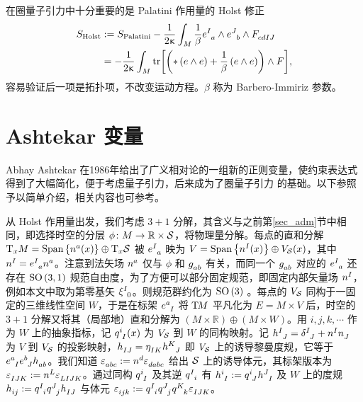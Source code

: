 		在圈量子引力中十分重要的是 Palatini 作用量的 Holst 修正
		\begin{equation}
			\begin{split}
				S_{\text{Holst}} &\definedby S_{\text{Palatini}} - \frac{1}{2\gkappa} \int_M \frac{1}{\beta} \tensor{e}{^I_a} \wedge \tensor{e}{^J_b} \wedge \tensor{F}{_c_d_I_J}\\
				&= - \frac{1}{2\gkappa} \int_M \tr[\left( *\left( e \wedge e \right) + \frac{1}{\beta} \left( e \wedge e \right) \right) \wedge F],\label{eq-Holst_action}
			\end{split}
		\end{equation}
		容易验证后一项是拓扑项，不改变运动方程。$\beta$ 称为 Barbero-Immiriz 参数。


	\section{Ashtekar 变量}

		Abhay Ashtekar 在1986年给出了广义相对论的一组新的正则变量\cite{Ashtekar1986,Ashtekar1987}，使约束表达式得到了大幅简化，便于考虑量子引力，后来成为了圈量子引力 的基础。以下参照  予以简单介绍，相关内容也可参考。

		从 Holst 作用量出发，我们考虑 $3+1$ 分解，其含义与之前第\ref{sec_adm}节中相同，即选择时空的分层 $\phi \colon M \rightarrow \mathbb{R} \times \mathcal{S}$，将物理量分解。每点的直和分解 $\TBx[x]{M} = \Span\left\{ \tensor{n}{^a}(x) \right\} \oplus \TBx[x]{\spc}$ 被 $\tensor{e}{^I_a}$ 映为 $V = \Span\left\{ \tensor{n}{^I}(x) \right\} \oplus V_{\spc}(x)$，其中 $\tensor{n}{^I} = \tensor{e}{^I_a} \tensor{n}{^a}$。注意到法矢场 $\tensor{n}{^a}$ 仅与 $\phi$ 和 $\tensor{g}{_a_b}$ 有关，而同一个 $\tensor{g}{_a_b}$ 对应的 $\tensor{e}{^I_a}$ 还存在 $\mathrm{SO}\left(3,1\right)$ 规范自由度，为了方便可以部分固定规范，即固定内部矢量场 $\tensor{n}{^I}$，例如本文中取为第零基矢 $\tensor{\xi}{^I_0}$。则规范群约化为 $\mathrm{SO}\left(3\right)$ 。每点的 $V_{\mathcal{S}}$ 同构于一固定的三维线性空间 $W$，于是在标架 $\tensor{e}{^a_I}$ 将 $\mathrm{T}_{{}}\!{M}$ 平凡化为 $E=M\times V$ 后，时空的 $3+1$ 分解又将其（局部地）直和分解为 $\left( M \times \mathbb{R} \right) \oplus \left( M \times W \right)$。用 $i,j,k,\cdots$ 作为 $W$ 上的抽象指标，记 $\tensor{q}{^i_I}(x)$ 为 $V_{\mathcal{S}}$ 到 $W$ 的同构映射。记 $\tensor{h}{^I_J} = \tensor{\delta}{^I_J} + \tensor{n}{^I} \tensor{n}{_J}$ 为 $V$ 到 $V_{\mathcal{S}}$ 的投影映射，$\tensor{h}{_I_J} = \tensor{\eta}{_I_K} \tensor{h}{^K_J}$ 即 $V_{\mathcal{S}}$ 上的诱导黎曼度规，它等于 $\tensor{e}{^a_I} \tensor{e}{^b_J} \tensor{h}{_a_b}$。我们知道 $\tensor{\vol}{_a_b_c} \definedby \tensor{n}{^d} \tensor{\vol}{_d_a_b_c}$ 给出 $\mathcal{S}$ 上的诱导体元，其标架版本为 $\tensor{\vol}{_I_J_K} \definedby \tensor{n}{^L} \tensor{\vol}{_L_I_J_K}$。通过同构 $\tensor{q}{^i_I}$ 及其逆 $\tensor{q}{^I_i}$ 有 $\tensor{h}{^i_I} \definedby \tensor{q}{^i_J} \tensor{h}{^J_I}$ 及 $W$ 上的度规 $\tensor{h}{_i_j} \definedby \tensor{q}{^I_i} \tensor{q}{^J_j} \tensor{h}{_I_J}$ 与体元 $\tensor{\vol}{_i_j_k} \definedby \tensor{q}{^I_i} \tensor{q}{^J_j} \tensor{q}{^K_k} \tensor{\vol}{_I_J_K}$。
		
